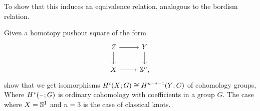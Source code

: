 \documentclass[reqno]{amsart}
\begin{document}
\begin{proposal}\label{p:bordism_relation}
To show that this induces an equivalence relation, analogous to the bordism relation.
\end{proposal}

\begin{proposal}\label{p:duality}
Given a homotopy pushout square of the form
\begin{equation*}
\begin{tikzcd}
Z \arrow[r] \arrow[d] & Y \arrow[d] \\
X \arrow[r] & \sphere{n},
\end{tikzcd}
\end{equation*}
show that we get isomorphisms $\isom{H^i(X;G)}{H^{n-i-1}(Y;G)}$ of cohomology groups,
Where $H^\ast(\mathord{\hspace{1pt}\text{--}\hspace{1pt}};G)$ is ordinary cohomology with coefficients in a group $G$.
The case where $X=\mathbb{S}^{1}$ and $n=3$ is the case of classical knots.
\end{proposal}
\end{document}
